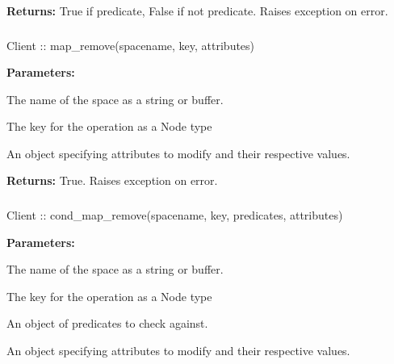\noindent\textbf{Returns:}
True if predicate, False if not predicate.  Raises exception on error.

\subsubsection{}
\label{api:nodejs:map_remove}
\begin{javascriptcode}
Client :: map_remove(spacename, key, attributes)
\end{javascriptcode}


\noindent\textbf{Parameters:}
\begin{description}[labelindent=\widthof{{\code{attributes}}},leftmargin=*,noitemsep,nolistsep,align=right]
\item[\code{spacename}] The name of the space as a string or buffer.
\item[\code{key}] The key for the operation as a Node type
\item[\code{attributes}] An object specifying attributes to modify and their respective values.
\end{description}

\noindent\textbf{Returns:}
True.  Raises exception on error.

\subsubsection{}
\label{api:nodejs:cond_map_remove}
\begin{javascriptcode}
Client :: cond_map_remove(spacename, key, predicates, attributes)
\end{javascriptcode}


\noindent\textbf{Parameters:}
\begin{description}[labelindent=\widthof{{\code{predicates}}},leftmargin=*,noitemsep,nolistsep,align=right]
\item[\code{spacename}] The name of the space as a string or buffer.
\item[\code{key}] The key for the operation as a Node type
\item[\code{predicates}] An object of predicates to check against.
\item[\code{attributes}] An object specifying attributes to modify and their respective values.
\end{description}


